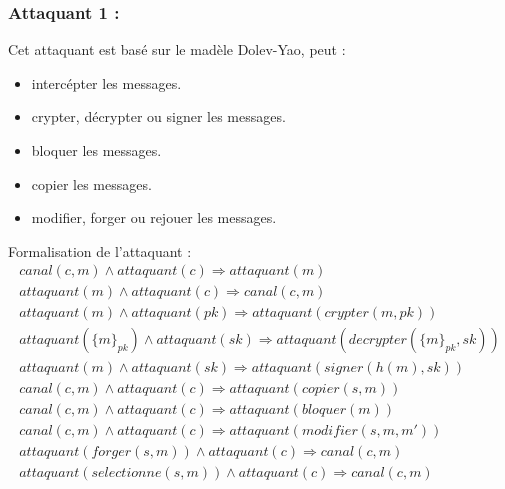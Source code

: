 \documentclass[10pt,a4paper]{article}
\begin{document}
\subsubsection{Attaquant 1 :}
Cet attaquant est basé sur le madèle Dolev-Yao, peut :
\begin{itemize}
\item intercépter les messages.
\item crypter, décrypter ou signer les messages.
\item bloquer les messages.
\item copier les messages.
\item modifier, forger ou rejouer les messages.\\
\end{itemize}
Formalisation de l'attaquant :   
\[
\begin{array}{l}
canal(c,m)\wedge attaquant(c)\Longrightarrow attaquant(m)\\
attaquant(m)\wedge attaquant(c)\Longrightarrow canal(c,m)\\
attaquant(m)\wedge attaquant(pk)\Longrightarrow attaquant(crypter(m,pk))\\
attaquant({\lbrace m \rbrace}_{pk}) \wedge attaquant(sk)\Longrightarrow attaquant(decrypter({\lbrace m \rbrace}_{pk},sk))\\ 
attaquant(m)\wedge attaquant(sk)\Longrightarrow attaquant(signer(h(m),sk))\\
canal(c,m)\wedge attaquant(c)\Longrightarrow attaquant(copier(s,m))\\
canal(c,m)\wedge attaquant(c)\Longrightarrow attaquant(bloquer(m))\\
canal(c,m)\wedge attaquant(c)\Longrightarrow attaquant(modifier(s,m,m'))\\
attaquant(forger(s,m))\wedge attaquant(c)\Longrightarrow canal(c,m)\\
attaquant(selectionne(s,m))\wedge attaquant(c)\Longrightarrow canal(c,m)\\  
  
  \end{array}
\]
\end{document}
